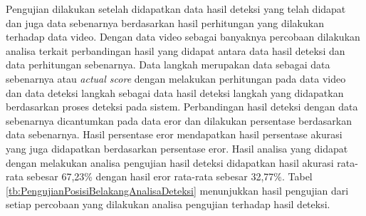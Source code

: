 Pengujian dilakukan setelah didapatkan data hasil deteksi yang telah didapat dan juga data sebenarnya berdasarkan hasil perhitungan yang dilakukan terhadap data video. Dengan data video sebagai banyaknya percobaan dilakukan analisa terkait perbandingan hasil yang didapat antara data hasil deteksi dan data perhitungan sebenarnya. Data langkah merupakan data sebagai data sebenarnya atau \emph{actual score} dengan melakukan perhitungan pada data video dan data deteksi langkah sebagai data hasil deteksi langkah yang didapatkan berdasarkan proses deteksi pada sistem. Perbandingan hasil deteksi dengan data sebenarnya dicantumkan pada data eror dan dilakukan persentase berdasarkan data sebenarnya. Hasil persentase eror mendapatkan hasil persentase akurasi yang juga didapatkan berdasarkan persentase eror. Hasil analisa yang didapat dengan melakukan analisa pengujian hasil deteksi didapatkan hasil akurasi rata-rata sebesar 67,23\% dengan hasil eror rata-rata sebesar 32,77\%. Tabel \ref{tb:PengujianPosisiBelakangAnalisaDeteksi} menunjukkan hasil pengujian dari setiap percobaan yang dilakukan analisa pengujian terhadap hasil deteksi.

